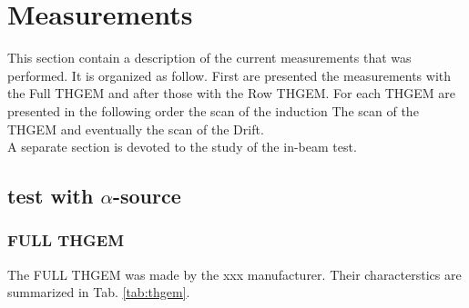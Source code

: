 \documentclass[a4paper, 11 pt]{report}
\begin{document}
\chapter{Measurements}


This section contain a description of the current measurements that was performed. It  is
organized as follow. First are presented the measurements with the Full THGEM and after those with 
the Row THGEM. For each THGEM are presented in the following order the scan of the induction The 
scan of the THGEM and eventually the scan of the Drift.\\
A separate section is devoted to the study of the in-beam test.

\section{test with $\alpha$-source}

\subsection{FULL THGEM}
The FULL THGEM was made by the xxx manufacturer. Their characterstics are summarized in Tab.
\ref{tab:thgem}.
\end{document}
